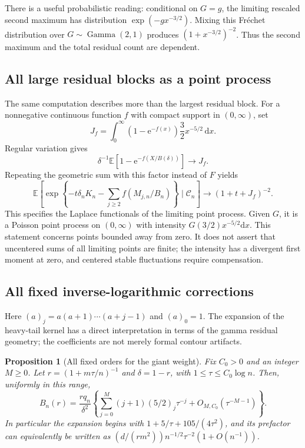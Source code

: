 \documentclass[11pt]{article}
\newtheorem{proposition}[theorem]{Proposition}
\theoremstyle{remark}\newtheorem{remark}[theorem]{Remark}
\theoremstyle{definition}\newtheorem{definition}[theorem]{Definition}
\newcommand{\dd}{\mathrm d}
\newcommand{\e}{\mathrm e}
\newcommand{\E}{\mathbb E}
\newcommand{\Cev}{\mathcal C_n}
\begin{document}
There is a useful probabilistic reading: conditional on $G=g$, the
limiting rescaled second maximum has distribution
$\exp(-g x^{-3/2})$. Mixing this Fr\'echet distribution over
$G\sim\operatorname{Gamma}(2,1)$ produces $(1+x^{-3/2})^{-2}$.
Thus the second maximum and the total residual count are dependent.

\subsection{All large residual blocks as a point process}
The same computation describes more than the largest residual block.
For a nonnegative continuous function $f$ with compact support in
$(0,\infty)$, set
\[
 J_f=\int_0^\infty(1-\e^{-f(x)})\frac32x^{-5/2}\,\dd x.
\]
Regular variation gives
\[
 \delta^{-1}\E[1-\e^{-f(X/B(\delta))}]\longrightarrow J_f.
\]
Repeating the geometric sum with this factor instead of $F$ yields
\begin{equation}\label{tss:cx:eq:process}
 \E\left[\exp\left\{-t\delta_nK_n
   -\sum_{j\ge2}f(M_{j,n}/B_n)\right\}\mid\Cev\right]
 \longrightarrow(1+t+J_f)^{-2}.
\end{equation}
This specifies the Laplace functionals of the limiting point process.
Given $G$, it is a Poisson point process on $(0,\infty)$ with
intensity $G(3/2)x^{-5/2}\dd x$. This statement concerns points bounded
away from zero. It does not assert that uncentered sums of all limiting
points are finite; the intensity has a divergent first moment at zero,
and centered stable fluctuations require compensation.

\subsection{All fixed inverse-logarithmic corrections}\label{tss:cx:sec:allorders}

Here $(a)_j=a(a+1)\cdots(a+j-1)$ and $(a)_0=1$. The expansion of the heavy-tail kernel has a direct interpretation
in terms of the gamma residual geometry; the coefficients are not
merely formal contour artifacts.

\begin{proposition}[All fixed orders for the giant weight]\label{tss:cx:prop:allorders}
Fix $C_0>0$ and an integer $M\geq0$. Let
$r=(1+m\tau/n)^{-1}$ and $\delta=1-r$, with
$1\leq\tau\leq C_0\log n$. Then, uniformly in this range,
\[
B_n(r)=\frac{rq_n}{\delta^2}
 \left\{\sum_{j=0}^{M}(j+1)(5/2)_j\tau^{-j}
                  +O_{M,C_0}(\tau^{-M-1})\right\}.
\]
In particular the expansion begins with $1+5/\tau+105/(4\tau^2)$,
and its prefactor can equivalently be written as
$(d/(rm^2))n^{-1/2}\tau^{-2}(1+O(n^{-1}))$.
\end{proposition}
\end{document}
